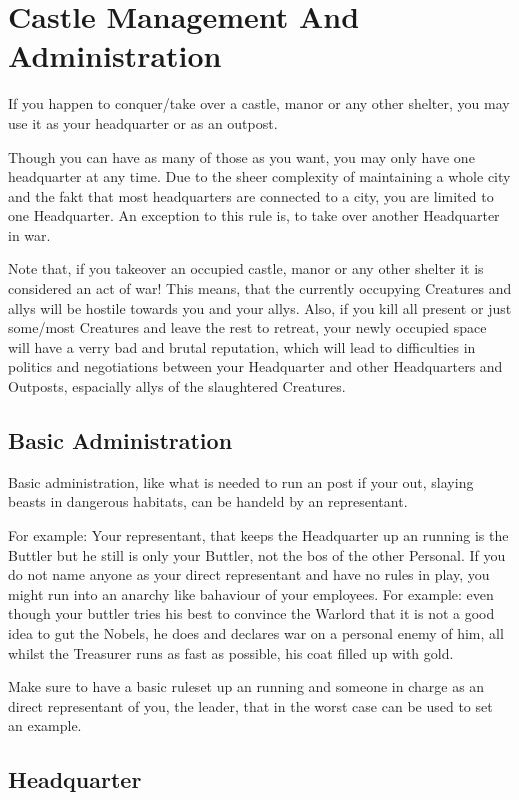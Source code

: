 \section{Castle Management And Administration}

If you happen to conquer/take over a castle, manor or any other shelter, you may use it as your headquarter or as an outpost.

Though you can have as many of those as you want, you may only have one headquarter at any time. Due to the sheer complexity of maintaining a whole city and the fakt that most headquarters are connected to a city, you are limited to one Headquarter. An exception to this rule is, to take over another Headquarter in war.

Note that, if you takeover an occupied castle, manor or any other shelter it is considered an act of war! This means, that the currently occupying Creatures and allys will be hostile towards you and your allys. Also, if you kill all present or just some/most Creatures and leave the rest to retreat, your newly occupied space will have a verry bad and brutal reputation, which will lead to difficulties in politics and negotiations between your Headquarter and other Headquarters and Outposts, espacially allys of the slaughtered Creatures.

\subsection{Basic Administration}

Basic administration, like what is needed to run an post if your out, slaying beasts in dangerous habitats, can be handeld by an representant.

For example: Your representant, that keeps the Headquarter up an running is the Buttler but he still is only your Buttler, not the bos of the other Personal. If you do not name anyone as your direct representant and have no rules in play, you might run into an anarchy like bahaviour of your employees. For example: even though your buttler tries his best to convince the Warlord that it is not a good idea to gut the Nobels, he does and declares war on a personal enemy of him, all whilst the Treasurer runs as fast as possible, his coat filled up with gold.

Make sure to have a basic ruleset up an running and someone in charge as an direct representant of you, the leader, that in the worst case can be used to set an example.

\subsection{Headquarter}

